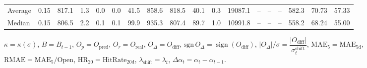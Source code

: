 \begin{threeparttable}
{\begin{tabular}{lrrrrrrrrrrrrrrrrr}
Average &     0.15 & 817.1 &               1.3 &               0.0 &                0.0 &               41.5 &   858.6 & 818.5 &       40.1 &                      0.3 &             19087.1 &         -- &        -- &             -- &            582.3 &           70.73 &                  57.33 \\
 Median &     0.15 & 806.5 &               2.2 &               0.1 &                0.1 &               99.9 &   935.3 & 807.4 &       89.7 &                      1.0 &             10991.8 &         -- &        -- &             -- &            558.2 &           68.24 &                  55.00 \\
\bottomrule
\end{tabular}
}
\begin{tablenotes}\footnotesize
\item $\kappa=\kappa(\sigma)$, $B=B_{t-1}$, $O_p=O_{\text{pred}}$, $O_r=O_{\text{real}}$, $O_\Delta=O_{\text{diff}}$, $\mathrm{sgn}\,O_\Delta=\operatorname{sign}(O_{\text{diff}})$, $|O_\Delta|/\sigma=\dfrac{|O_{\text{diff}}|}{\sigma_t^{\text{shift}}}$, $\mathrm{MAE}_5=\mathrm{MAE}_{5\text{d}}$, $\mathrm{RMAE}= \mathrm{MAE}_5 / \text{Open}$, $\mathrm{HR}_{20}=\mathrm{HitRate}_{20\text{d}}$, 
$\lambda_{\text{shift}}=\lambda_t$, 
$\Delta\alpha_t=\alpha_t-\alpha_{t-1}$.
\end{tablenotes}
\end{threeparttable}
\endgroup

